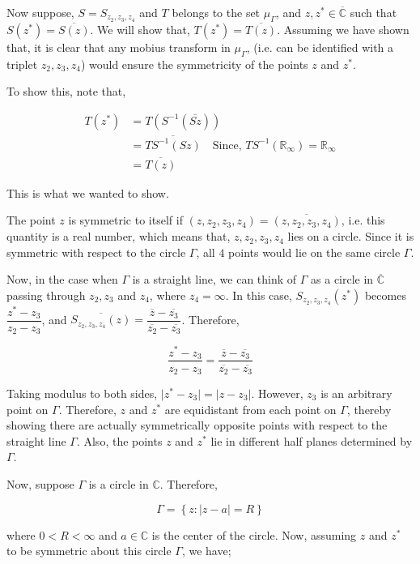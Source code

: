 \documentclass[12pt]{article}
\newcommand{\Rinf}{\mathbb{R}_{\infty}}
\newcommand{\C}{\mathbb{C}}
\newcommand{\Cinf}{\overline{\C}}
\theoremstyle{definition}
\newenvironment{note}{
\begin{tcolorbox}[colback=blue!5!white,colframe=blue!75!black,title=Note, parbox = false] }{\end{tcolorbox} }
\begin{document}
Now suppose, $S = S_{z_2, z_3, z_4}$ and $T$ belongs to the set $\mu_\Gamma$, and $z, z^\ast \in \Cinf$ such that $S(z^\ast) = \overline{S(z)}$. We will show that, $T(z^\ast) = \overline{T(z)}$. Assuming we have shown that, it is clear that any mobius transform in $\mu_\Gamma$, (i.e. can be identified with a triplet $z_2, z_3, z_4$) would ensure the symmetricity of the points $z$ and $z^\ast$.

To show this, note that,

\begin{align*}
    T(z^\ast)
    & = T(S^{-1}(\overline{Sz}))\\
    & = \overline{ TS^{-1}(Sz) } \quad \text{Since, } TS^{-1}(\Rinf) = \Rinf\\
    & = \overline{ T(z) }
\end{align*}

This is what we wanted to show.


\begin{note}
    The point $z$ is symmetric to itself if $(z, z_2, z_3, z_4) = \overline{(z, z_2, z_3, z_4)}$, i.e. this quantity is a real number, which means that, $z, z_2, z_3, z_4$ lies on a circle. Since it is symmetric with respect to the circle $\Gamma$, all $4$ points would lie on the same circle $\Gamma$.
\end{note}

Now, in the case when $\Gamma$ is a straight line, we can think of $\Gamma$ as a circle in $\Cinf$ passing through $z_2, z_3$ and $z_4$, where $z_4 = \infty$. In this case, $S_{z_2, z_3, z_4}(z^\ast)$ becomes $\dfrac{z^\ast - z_3}{z_2 - z_3}$, and $\overline{S_{z_2, z_3, z_4}(z)} = \dfrac{\overline{z} - \overline{z_3}}{\overline{z_2} - \overline{z_3}}$. Therefore, 

$$\dfrac{z^\ast - z_3}{z_2 - z_3} = \dfrac{\overline{z} - \overline{z_3}}{\overline{z_2} - \overline{z_3}}$$

Taking modulus to both sides, $\vert z^\ast - z_3\vert = \vert z - z_3 \vert$. However, $z_3$ is an arbitrary point on $\Gamma$. Therefore, $z$ and $z^\ast$ are equidistant from each point on $\Gamma$, thereby showing there are actually symmetrically opposite points with respect to the straight line $\Gamma$. Also, the points $z$ and $z^\ast$ lie in different half planes determined by $\Gamma$.

Now, suppose $\Gamma$ is a circle in $\C$. Therefore, 

$$\Gamma = \left\{ z: \vert z - a \vert = R \right\}$$

where $0 < R < \infty$ and $a\in \C$ is the center of the circle. Now, assuming $z$ and $z^\ast$ to be symmetric about this circle $\Gamma$, we have;
\end{document}
